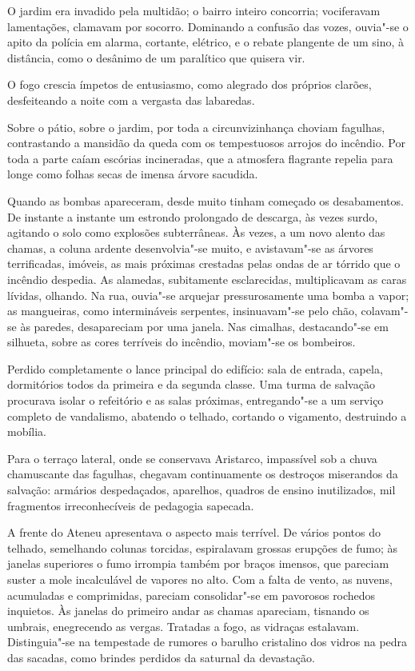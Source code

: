 O jardim era invadido pela multidão; o bairro inteiro concorria;
vociferavam lamentações, clamavam por socorro. Dominando a confusão das
vozes, ouvia"-se o apito da polícia em alarma, cortante, elétrico, e o
rebate plangente de um sino, à distância, como o desânimo de um
paralítico que quisera vir. 

O fogo crescia ímpetos de entusiasmo, como
alegrado dos próprios clarões, desfeiteando a noite com a vergasta das
labaredas. 

Sobre o pátio, sobre o jardim, por toda a circunvizinhança
choviam fagulhas, contrastando a mansidão da queda com os tempestuosos
arrojos do incêndio. Por toda a parte caíam escórias incineradas, que a
atmosfera flagrante repelia para longe como folhas secas de imensa
árvore sacudida. 

Quando as bombas apareceram, desde muito tinham
começado os desabamentos. De instante a instante um estrondo prolongado
de descarga, às vezes surdo, agitando o solo como explosões
subterrâneas. Às vezes, a um novo alento das chamas, a coluna ardente
desenvolvia"-se muito, e avistavam"-se as árvores terrificadas,
imóveis, as mais próximas crestadas pelas ondas de ar tórrido que o
incêndio despedia. As alamedas, subitamente esclarecidas, multiplicavam
as caras lívidas, olhando. Na rua, ouvia"-se arquejar pressurosamente
uma bomba a vapor; as mangueiras, como intermináveis serpentes,
insinuavam"-se pelo chão, colavam"-se às paredes, desapareciam por
uma janela. Nas cimalhas, destacando"-se em silhueta, sobre as cores
terríveis do incêndio, moviam"-se os bombeiros. 

Perdido completamente o lance principal do edifício: sala de 
entrada, capela, dormitórios
todos da primeira e da segunda classe. Uma turma de salvação procurava
isolar o refeitório e as salas próximas, entregando"-se a um serviço
completo de vandalismo, abatendo o telhado, cortando o vigamento,
destruindo a mobília. 

Para o terraço lateral, onde se conservava
Aristarco, impassível sob a chuva chamuscante das fagulhas, chegavam
continuamente os destroços miserandos da salvação: armários
despedaçados, aparelhos, quadros de ensino inutilizados, mil fragmentos
irreconhecíveis de pedagogia sapecada. 

A frente do Ateneu apresentava o
aspecto mais terrível. De vários pontos do telhado, semelhando colunas
torcidas, espiralavam grossas erupções de fumo; às janelas superiores o
fumo irrompia também por braços imensos, que pareciam suster a mole
incalculável de vapores no alto. Com a falta de vento, as nuvens,
acumuladas e comprimidas, pareciam consolidar"-se em pavorosos
rochedos inquietos. Às janelas do primeiro andar as chamas apareciam,
tisnando os umbrais, enegrecendo as vergas. Tratadas a fogo, as
vidraças estalavam. Distinguia"-se na tempestade de rumores o barulho
cristalino dos vidros na pedra das sacadas, como brindes perdidos da
saturnal da devastação. 

